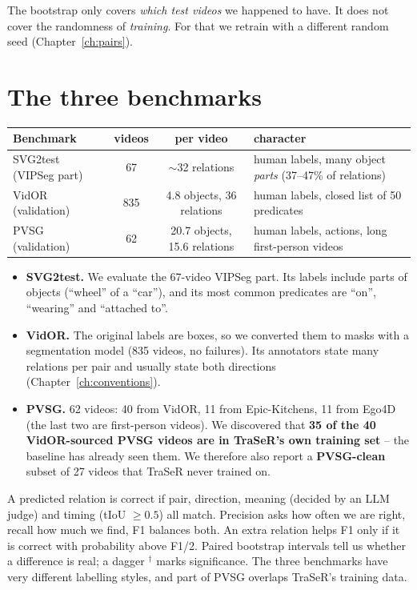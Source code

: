 \documentclass[11pt,openany]{book}
\newcommand{\sig}{\ensuremath{^\dagger}}
\begin{document}
The bootstrap only covers \emph{which test videos} we happened to have. It does not cover the randomness of \emph{training}. For
that we retrain with a different random seed (Chapter~\ref{ch:pairs}).

\section{The three benchmarks}
\begin{center}
\small
\begin{tabular}{@{}lccp{5.6cm}@{}}
\toprule
Benchmark & videos & per video & character \\
\midrule
SVG2test (VIPSeg part) & 67 & $\sim$32 relations & human labels, many object \emph{parts} (37--47\% of relations) \\
VidOR (validation) & 835 & 4.8 objects, 36 relations & human labels, closed list of 50 predicates \\
PVSG (validation) & 62 & 20.7 objects, 15.6 relations & human labels, actions, long first-person videos \\
\bottomrule
\end{tabular}
\end{center}
\begin{itemize}
  \item \textbf{SVG2test.} We evaluate the 67-video VIPSeg part. Its labels include parts of objects (``wheel'' of a ``car''),
  and its most common predicates are ``on'', ``wearing'' and ``attached to''.
  \item \textbf{VidOR.} The original labels are boxes, so we converted them to masks with a segmentation model (835 videos, no
  failures). Its annotators state many relations per pair and usually state both directions (Chapter~\ref{ch:conventions}).
  \item \textbf{PVSG.} 62 videos: 40 from VidOR, 11 from Epic-Kitchens, 11 from Ego4D (the last two are first-person videos).
  We discovered that \textbf{35 of the 40 VidOR-sourced PVSG videos are in TraSeR's own training set} -- the baseline has
  already seen them. We therefore also report a \textbf{PVSG-clean} subset of 27 videos that TraSeR never trained on.
\end{itemize}

\begin{summarybox}
A predicted relation is correct if pair, direction, meaning (decided by an LLM judge) and timing (tIoU $\ge 0.5$) all match.
Precision asks how often we are right, recall how much we find, F1 balances both. An extra relation helps F1 only if it is
correct with probability above F1/2. Paired bootstrap intervals tell us whether a difference is real; a dagger \sig{} marks
significance. The three benchmarks have very different labelling styles, and part of PVSG overlaps TraSeR's training data.
\end{summarybox}
\end{document}
